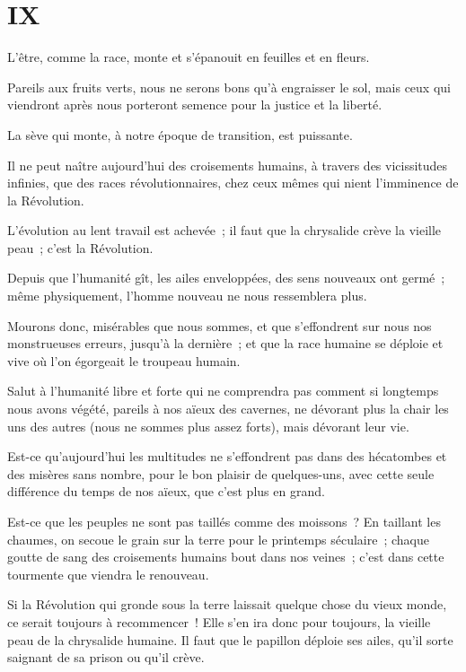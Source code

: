 \documentclass[french,twoside]{book} %
\newcommand\chapteropen{} %
\newcommand\chaptercont{} %
\begin{document}
\chapteropen
 \chapter[{IX}]{IX}
\label{p1.9}

\chaptercont
\noindent L’être, comme la race, monte et s’épanouit en feuilles et en fleurs.\par
Pareils aux fruits verts, nous ne serons bons qu’à engraisser le sol, mais ceux qui viendront après nous porteront semence pour la justice et la liberté.\par
La sève qui monte, à notre époque de transition, est puissante.\par
Il ne peut naître aujourd’hui des croisements humains, à travers des vicissitudes infinies, que des races révolutionnaires, chez ceux mêmes qui nient l’imminence de la Révolution.\par
L’évolution au lent travail est achevée ; il faut que la chrysalide crève la vieille peau ; c’est la Révolution.\par
Depuis que l’humanité gît, les ailes enveloppées, des sens nouveaux ont germé ; même physiquement, l’homme nouveau ne nous ressemblera plus.\par
 Mourons donc, misérables que nous sommes, et que s’effondrent sur nous nos monstrueuses erreurs, jusqu’à la dernière ; et que la race humaine se déploie et vive où l’on égorgeait le troupeau humain.\par
Salut à l’humanité libre et forte qui ne comprendra pas comment si longtemps nous avons végété, pareils à nos aïeux des cavernes, ne dévorant plus la chair les uns des autres (nous ne sommes plus assez forts), mais dévorant leur vie.\par
Est-ce qu’aujourd’hui les multitudes ne s’effondrent pas dans des hécatombes et des misères sans nombre, pour le bon plaisir de quelques-uns, avec cette seule différence du temps de nos aïeux, que c’est plus en grand.\par
Est-ce que les peuples ne sont pas taillés comme des moissons ? En taillant les chaumes, on secoue le grain sur la terre pour le printemps séculaire ; chaque goutte de sang des croisements humains bout dans nos veines ; c’est dans cette tourmente que viendra le renouveau.\par
Si la Révolution qui gronde sous la terre laissait quelque chose du vieux monde, ce serait toujours à recommencer ! Elle s’en ira donc pour toujours, la vieille peau de la chrysalide humaine. Il faut que le papillon déploie ses ailes, qu’il sorte saignant de sa prison ou qu’il crève.\par
\end{document}
